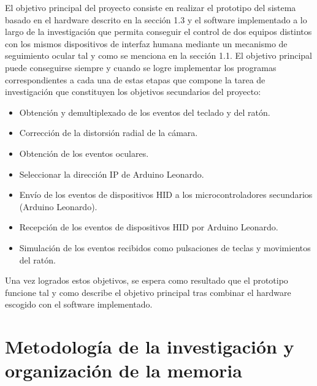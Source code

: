 El objetivo principal del proyecto consiste en realizar el prototipo del sistema basado en el hardware descrito en la sección 1.3 y el software implementado a lo largo de la investigación que permita conseguir el control de dos equipos distintos con los mismos dispositivos de interfaz humana mediante un mecanismo de seguimiento ocular tal y como se menciona en la sección 1.1. 
El objetivo principal puede conseguirse siempre y cuando se logre implementar los programas correspondientes a cada una de estas etapas que compone la tarea de investigación que constituyen los objetivos secundarios del proyecto:
\begin{itemize}
    \item Obtención y demultiplexado de los eventos del teclado y del ratón.
    \item Corrección de la distorsión radial de la cámara.
    \item Obtención de los eventos oculares.
    \item Seleccionar la dirección IP de Arduino Leonardo.
    \item Envío de los eventos de dispositivos HID a los microcontroladores secundarios (Arduino Leonardo).
    \item Recepción de los eventos de dispositivos HID por Arduino Leonardo.
    \item Simulación de los eventos recibidos como pulsaciones de teclas y movimientos del ratón.

\end{itemize}

Una vez logrados estos objetivos, se espera como resultado que el prototipo funcione tal y como describe el objetivo principal tras combinar el hardware escogido con el software implementado.

\section{Metodología de la investigación y organización de la memoria} \label{s1_5}


